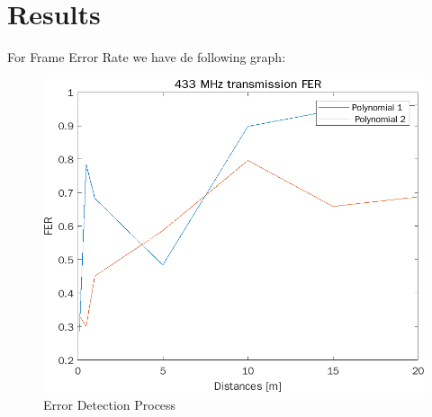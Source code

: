 \section{Results}

For Frame Error Rate we have de following graph:
\begin{figure}[!htbp]
	\centering
	\includegraphics [scale=0.55]{images/FERt.png}
	\caption{Error Detection Process}
\end{figure} 